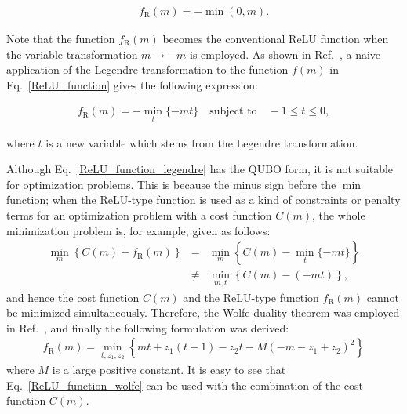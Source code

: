 \documentclass[fp,twocolumn]{jpsj3}
\begin{document}
\begin{eqnarray}
  f_{\mathrm{R}}(m)=-\min{(0,m)}. \label{ReLU_function}
\end{eqnarray}

\noindent
Note that the function $f_{\mathrm{R}}(m)$ becomes the conventional ReLU function when the variable transformation $m \to -m$ is employed.
As shown in Ref.~, a naive application of the Legendre transformation to the function $f(m)$ in Eq.~\eqref{ReLU_function} gives the following expression:

\begin{eqnarray}
  f_{\mathrm{R}}(m)=-\min_{t}{\{-mt\}} \quad \text{subject to} \quad -1\leq t\leq 0, \label{ReLU_function_legendre}
\end{eqnarray}

\noindent
where $t$ is a new variable which stems from the Legendre transformation.


Although Eq.~\eqref{ReLU_function_legendre} has the QUBO form, it is not suitable for optimization problems.
This is because the minus sign before the $\min$ function;
when the ReLU-type function is used as a kind of constraints or penalty terms for an optimization problem with a cost function $C(m)$, the whole minimization problem is, for example, given as follows:
\begin{eqnarray}
  \min_{m} \left\{ C(m)+f_{\mathrm{R}}(m) \right\} &=& \min_{m}\left\{ C(m)-\min_{t} \{-mt\} \right\} \nonumber \\
  &\neq& \min_{m,t} \left\{C(m)-(-mt)\right\} ,
\end{eqnarray}
and hence the cost function $C(m)$ and the ReLU-type function $f_{\mathrm{R}}(m)$ cannot be minimized simultaneously.
Therefore, the Wolfe duality theorem was employed in Ref.~, and finally the following formulation was derived:
\begin{eqnarray}
  f_{\mathrm{R}}(m)=\min_{t,z_{1},z_{2}} \left\{mt+z_{1}(t+1)-z_{2}t-M(-m-z_{1}+z_{2})^{2}\right\} \label{ReLU_function_wolfe}
\end{eqnarray}
where $M$ is a large positive constant. 
It is easy to see that Eq.~\eqref{ReLU_function_wolfe} can be used with the combination of the cost function $C(m)$.
\end{document}
